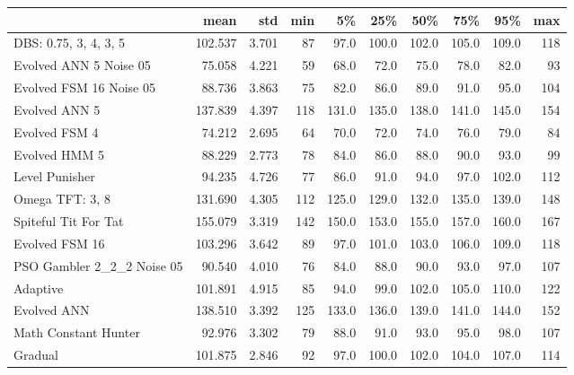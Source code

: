 \begin{tabular}{lrrrrrrrrr}
\toprule
{} &     mean &    std &  min &     5\% &    25\% &    50\% &    75\% &    95\% &  max \\
\midrule
DBS: 0.75, 3, 4, 3, 5      &  102.537 &  3.701 &   87 &   97.0 &  100.0 &  102.0 &  105.0 &  109.0 &  118 \\
Evolved ANN 5 Noise 05     &   75.058 &  4.221 &   59 &   68.0 &   72.0 &   75.0 &   78.0 &   82.0 &   93 \\
Evolved FSM 16 Noise 05    &   88.736 &  3.863 &   75 &   82.0 &   86.0 &   89.0 &   91.0 &   95.0 &  104 \\
Evolved ANN 5              &  137.839 &  4.397 &  118 &  131.0 &  135.0 &  138.0 &  141.0 &  145.0 &  154 \\
Evolved FSM 4              &   74.212 &  2.695 &   64 &   70.0 &   72.0 &   74.0 &   76.0 &   79.0 &   84 \\
Evolved HMM 5              &   88.229 &  2.773 &   78 &   84.0 &   86.0 &   88.0 &   90.0 &   93.0 &   99 \\
Level Punisher             &   94.235 &  4.726 &   77 &   86.0 &   91.0 &   94.0 &   97.0 &  102.0 &  112 \\
Omega TFT: 3, 8            &  131.690 &  4.305 &  112 &  125.0 &  129.0 &  132.0 &  135.0 &  139.0 &  148 \\
Spiteful Tit For Tat       &  155.079 &  3.319 &  142 &  150.0 &  153.0 &  155.0 &  157.0 &  160.0 &  167 \\
Evolved FSM 16             &  103.296 &  3.642 &   89 &   97.0 &  101.0 &  103.0 &  106.0 &  109.0 &  118 \\
PSO Gambler 2\_2\_2 Noise 05 &   90.540 &  4.010 &   76 &   84.0 &   88.0 &   90.0 &   93.0 &   97.0 &  107 \\
Adaptive                   &  101.891 &  4.915 &   85 &   94.0 &   99.0 &  102.0 &  105.0 &  110.0 &  122 \\
Evolved ANN                &  138.510 &  3.392 &  125 &  133.0 &  136.0 &  139.0 &  141.0 &  144.0 &  152 \\
Math Constant Hunter       &   92.976 &  3.302 &   79 &   88.0 &   91.0 &   93.0 &   95.0 &   98.0 &  107 \\
Gradual                    &  101.875 &  2.846 &   92 &   97.0 &  100.0 &  102.0 &  104.0 &  107.0 &  114 \\
\bottomrule
\end{tabular}
